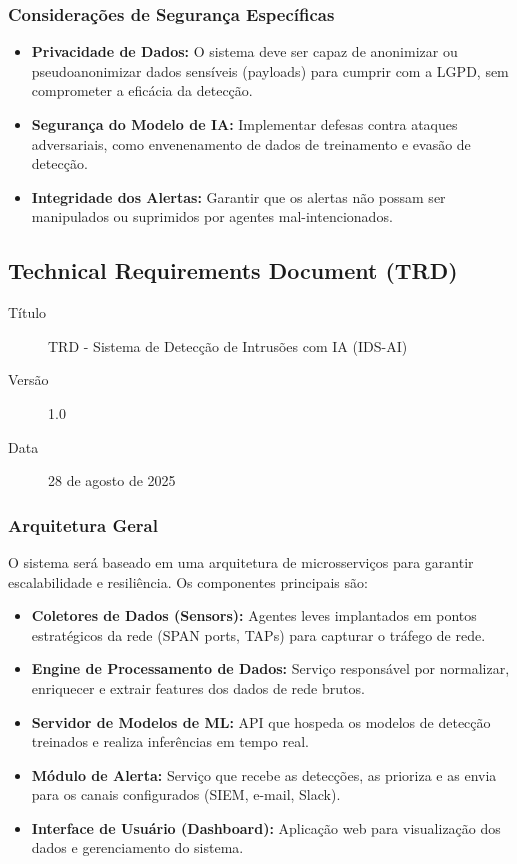\documentclass[a4paper,12pt]{article}
\begin{document}
\subsubsection{Considerações de Segurança Específicas}
\begin{itemize}
    \item \textbf{Privacidade de Dados:} O sistema deve ser capaz de anonimizar ou pseudoanonimizar dados sensíveis (payloads) para cumprir com a LGPD, sem comprometer a eficácia da detecção.
    \item \textbf{Segurança do Modelo de IA:} Implementar defesas contra ataques adversariais, como envenenamento de dados de treinamento e evasão de detecção.
    \item \textbf{Integridade dos Alertas:} Garantir que os alertas não possam ser manipulados ou suprimidos por agentes mal-intencionados.
\end{itemize}

\subsection{Technical Requirements Document (TRD)}
\begin{description}
    \item[Título] TRD - Sistema de Detecção de Intrusões com IA (IDS-AI)
    \item[Versão] 1.0
    \item[Data] 28 de agosto de 2025
\end{description}

\subsubsection{Arquitetura Geral}
O sistema será baseado em uma arquitetura de microsserviços para garantir escalabilidade e resiliência. Os componentes principais são:
\begin{itemize}
    \item \textbf{Coletores de Dados (Sensors):} Agentes leves implantados em pontos estratégicos da rede (SPAN ports, TAPs) para capturar o tráfego de rede.
    \item \textbf{Engine de Processamento de Dados:} Serviço responsável por normalizar, enriquecer e extrair features dos dados de rede brutos.
    \item \textbf{Servidor de Modelos de ML:} API que hospeda os modelos de detecção treinados e realiza inferências em tempo real.
    \item \textbf{Módulo de Alerta:} Serviço que recebe as detecções, as prioriza e as envia para os canais configurados (SIEM, e-mail, Slack).
    \item \textbf{Interface de Usuário (Dashboard):} Aplicação web para visualização dos dados e gerenciamento do sistema.
\end{itemize}
\end{document}
